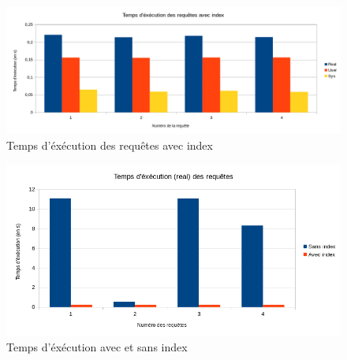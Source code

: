 \documentclass{article}
\begin{document}
\begin{figure}
	\begin{center}
		\includegraphics[scale=0.55]{images/rai}\\
		Temps d'\'ex\'ecution des requ\^etes avec index
	\end{center}
\end{figure}
\begin{figure}
	\begin{center}
		\includegraphics[scale=0.7]{images/siai}\\
		Temps d'\'ex\'ecution avec et sans index
	\end{center}
\end{figure}
\end{document}
